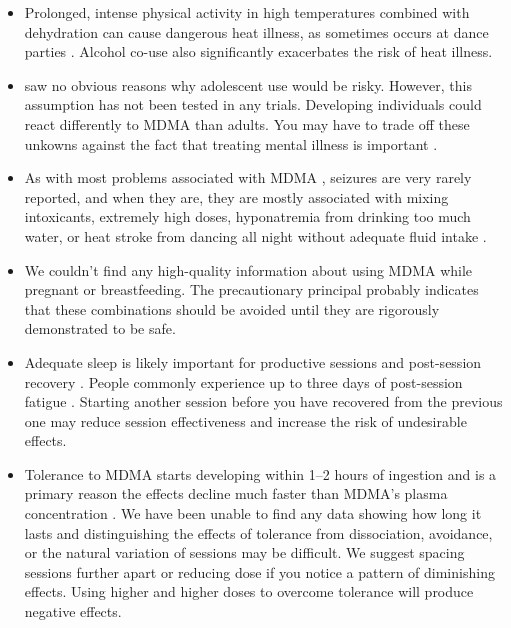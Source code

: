 \documentclass[12pt,letterpaper]{book}
\begin{document}
\begin{itemize}
    \item Prolonged, intense physical activity in high temperatures combined with dehydration can cause dangerous heat illness, as sometimes occurs at dance parties \cite{vanOverheatingAlcohol}. Alcohol co-use also significantly exacerbates the risk of heat illness.
    \item \textcite{kangaslampiAdolescent} saw no obvious reasons why adolescent use would be risky. However, this assumption has not been tested in any trials. Developing individuals could react differently to MDMA than adults. You may have to trade off these unkowns against the fact that treating mental illness is important \cite{mitchellMDMAClinicalTrial}.
    \item As with most problems associated with MDMA \cite{riggDeaths}, seizures are very rarely reported, and when they are, they are mostly associated with mixing intoxicants, extremely high doses, hyponatremia from drinking too much water, or heat stroke from dancing all night without adequate fluid intake \cite{freidelSeizures}.
    \item We couldn't find any high-quality information about using MDMA while pregnant or breastfeeding. The precautionary principal probably indicates that these combinations should be avoided until they are rigorously demonstrated to be safe.
    \item Adequate sleep is likely important for productive sessions and post-session recovery \cite{simon2020sleep}. People commonly experience up to three days of post-session fatigue \cite{liechtiGender}. Starting another session before you have recovered from the previous one may reduce session effectiveness and increase the risk of undesirable effects.
    \item Tolerance to MDMA starts developing within 1–2 hours of ingestion and is a primary reason the effects decline much faster than MDMA's plasma concentration \cite{farreTolerance,parrottTolerance}. We have been unable to find any data showing how long it lasts and distinguishing the effects of tolerance from dissociation, avoidance, or the natural variation of sessions may be difficult. We suggest spacing sessions further apart or reducing dose if you notice a pattern of diminishing effects. Using higher and higher doses to overcome tolerance will produce negative effects.
\end{itemize}
\end{document}
